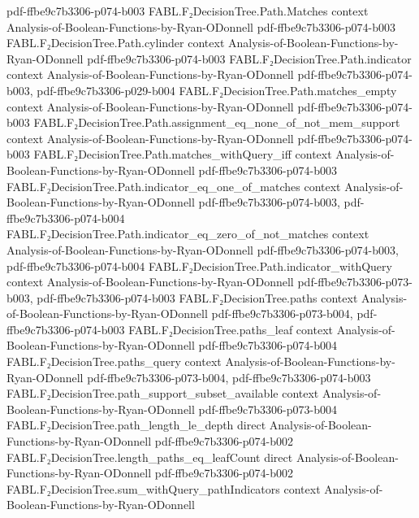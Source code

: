 \begin{theorem}
  {pdf-ffbe9c7b3306-p074-b003}
\proofstep
  {FABL.F₂DecisionTree.Path.Matches}
  {context}
  {Analysis-of-Boolean-Functions-by-Ryan-ODonnell}
  {pdf-ffbe9c7b3306-p074-b003}
\proofstep
  {FABL.F₂DecisionTree.Path.cylinder}
  {context}
  {Analysis-of-Boolean-Functions-by-Ryan-ODonnell}
  {pdf-ffbe9c7b3306-p074-b003}
\proofstep
  {FABL.F₂DecisionTree.Path.indicator}
  {context}
  {Analysis-of-Boolean-Functions-by-Ryan-ODonnell}
  {pdf-ffbe9c7b3306-p074-b003,
    pdf-ffbe9c7b3306-p029-b004}
\proofstep
  {FABL.F₂DecisionTree.Path.matches_empty}
  {context}
  {Analysis-of-Boolean-Functions-by-Ryan-ODonnell}
  {pdf-ffbe9c7b3306-p074-b003}
\proofstep
  {FABL.F₂DecisionTree.Path.assignment_eq_none_of_not_mem_support}
  {context}
  {Analysis-of-Boolean-Functions-by-Ryan-ODonnell}
  {pdf-ffbe9c7b3306-p074-b003}
\proofstep
  {FABL.F₂DecisionTree.Path.matches_withQuery_iff}
  {context}
  {Analysis-of-Boolean-Functions-by-Ryan-ODonnell}
  {pdf-ffbe9c7b3306-p074-b003}
\proofstep
  {FABL.F₂DecisionTree.Path.indicator_eq_one_of_matches}
  {context}
  {Analysis-of-Boolean-Functions-by-Ryan-ODonnell}
  {pdf-ffbe9c7b3306-p074-b003,
    pdf-ffbe9c7b3306-p074-b004}
\proofstep
  {FABL.F₂DecisionTree.Path.indicator_eq_zero_of_not_matches}
  {context}
  {Analysis-of-Boolean-Functions-by-Ryan-ODonnell}
  {pdf-ffbe9c7b3306-p074-b003,
    pdf-ffbe9c7b3306-p074-b004}
\proofstep
  {FABL.F₂DecisionTree.Path.indicator_withQuery}
  {context}
  {Analysis-of-Boolean-Functions-by-Ryan-ODonnell}
  {pdf-ffbe9c7b3306-p073-b003,
    pdf-ffbe9c7b3306-p074-b003}
\proofstep
  {FABL.F₂DecisionTree.paths}
  {context}
  {Analysis-of-Boolean-Functions-by-Ryan-ODonnell}
  {pdf-ffbe9c7b3306-p073-b004,
    pdf-ffbe9c7b3306-p074-b003}
\proofstep
  {FABL.F₂DecisionTree.paths_leaf}
  {context}
  {Analysis-of-Boolean-Functions-by-Ryan-ODonnell}
  {pdf-ffbe9c7b3306-p074-b004}
\proofstep
  {FABL.F₂DecisionTree.paths_query}
  {context}
  {Analysis-of-Boolean-Functions-by-Ryan-ODonnell}
  {pdf-ffbe9c7b3306-p073-b004,
    pdf-ffbe9c7b3306-p074-b003}
\proofstep
  {FABL.F₂DecisionTree.path_support_subset_available}
  {context}
  {Analysis-of-Boolean-Functions-by-Ryan-ODonnell}
  {pdf-ffbe9c7b3306-p073-b004}
\proofstep
  {FABL.F₂DecisionTree.path_length_le_depth}
  {direct}
  {Analysis-of-Boolean-Functions-by-Ryan-ODonnell}
  {pdf-ffbe9c7b3306-p074-b002}
\proofstep
  {FABL.F₂DecisionTree.length_paths_eq_leafCount}
  {direct}
  {Analysis-of-Boolean-Functions-by-Ryan-ODonnell}
  {pdf-ffbe9c7b3306-p074-b002}
\proofstep
  {FABL.F₂DecisionTree.sum_withQuery_pathIndicators}
  {context}
  {Analysis-of-Boolean-Functions-by-Ryan-ODonnell}

\end{theorem}
